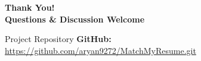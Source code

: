 \documentclass[aspectratio=169, 10pt]{beamer}
\begin{document}
\begin{frame}[plain]
  \centering
  \vspace{1.5cm}
  {\Huge \textbf{\textcolor{sggsblue}{Thank You!}}} \\[0.5cm]
  {\large \textbf{Questions \& Discussion Welcome}} \\[1.0cm]

  \begin{block}{Project Repository}
    \centering
    \textbf{GitHub:} \url{https://github.com/aryan9272/MatchMyResume.git}
  \end{block}
\end{frame}
\end{document}
